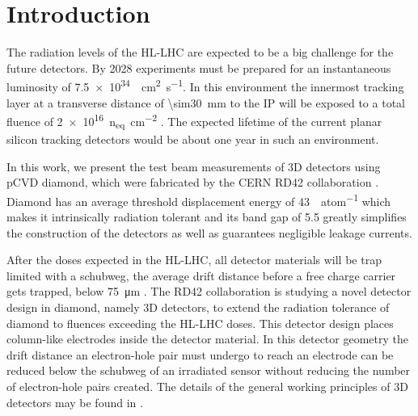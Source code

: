 \section{Introduction}
The radiation levels of the \ac{HL-LHC} are expected to be a big challenge for the future detectors. By 2028 experiments must be prepared for an instantaneous luminosity of \SI{7.5e34}{\per\centi\meter\squared\per\second}. In this environment the innermost tracking layer at a transverse distance of \SI{\sim30}{\milli\meter} to the \acl{IP} will be exposed to a total fluence of \SI{2e16}{n_{eq}\per\centi\meter^2} %
\cite{dose}. The expected lifetime of the current planar silicon tracking detectors would be about one year in such an environment.\par
In this work, we present the test beam measurements of 3D detectors using \ac{pCVD} diamond, which were fabricated by the CERN RD42 collaboration \cite{rd42}. Diamond has an average threshold displacement energy of \SI{43}{\ev\per atom} \cite{koike} which makes it intrinsically radiation tolerant and its band gap of \SI{5.5}{\ev} \cite{bandgap} greatly simplifies the construction of the detectors as well as guarantees negligible leakage currents.\par
After the doses expected in the \ac{HL-LHC}, all detector materials will be trap limited with a schubweg, the average drift distance before a free charge carrier gets trapped, below \SI{75}{\micro\meter} \cite{feick, wen2}. The RD42 collaboration is studying a novel detector design in diamond, namely 3D detectors, to extend the radiation tolerance of diamond to fluences exceeding the HL-LHC doses. This detector design places column-like electrodes inside the detector material. In this detector geometry the drift distance an electron-hole pair must undergo to reach an electrode can be reduced below the schubweg of an irradiated sensor without reducing the number of electron-hole pairs created. The details of the general working principles of 3D detectors may be found in \cite{parker}.
